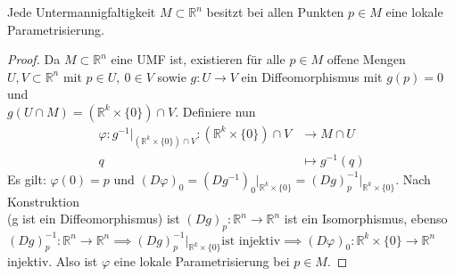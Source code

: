 \documentclass[../main.tex]{subfiles}
\begin{document}
\begin{proposition}
Jede Untermannigfaltigkeit $M \subset \mathbb{R}^n$ besitzt bei allen Punkten $p \in M$ eine lokale Parametrisierung.
\end{proposition}
\begin{proof}
Da $M \subset \mathbb{R}^n$ eine UMF ist, existieren für alle $p \in M$ offene Mengen $U,V \subset \mathbb{R}^n$ mit $p \in U, \ 0 \in V$ sowie $g : U \to V$ ein Diffeomorphismus mit $g(p)=0$ und \\
$g(U \cap M )=(\mathbb{R}^k \times \{0\} ) \cap V$.
Definiere nun \begin{align*}
    \varphi : g^{-1} \vert_{(\mathbb{R}^k \times \{0\})\cap V} \colon (\mathbb{R}^k \times \{0\})\cap V
    & \to M \cap U \\
    q & \mapsto g^{-1}(q)
\end{align*}
Es gilt: $\varphi (0) = p$ und $(D\varphi )_0 = \left(Dg^{-1}\right)_0 \vert_{ \mathbb{R}^k \times \{0\}}
 = (Dg)^{-1}_{p} \vert_{\mathbb{R}^k \times \{0\}}$. Nach Konstruktion \\(g ist ein Diffeomorphismus) ist
 $(Dg)_p : \mathbb{R}^n \to \mathbb{R}^n$ ist ein Isomorphismus, ebenso \\$(Dg)_p ^{-1} : \mathbb{R}^n \to \mathbb{R}^n \implies (Dg)^{-1}_{p} \vert_{\mathbb{R}^k \times \{0\}} \text{ist injektiv} \implies
 (D\varphi )_0 : \mathbb{R}^k \times \{0\} \to \mathbb{R}^n$ injektiv. Also ist $\varphi$ eine lokale Parametrisierung bei $p \in M$.
\end{proof}
\end{document}
